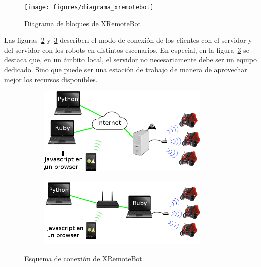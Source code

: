 \begin{figure}
    \centering
    \texttt{[image: figures/diagrama\_xremotebot]}
    \caption{Diagrama de bloques de XRemoteBot}\label{fig:diagrama_xremotebot}
\end{figure}

Las
figuras~\ref{fig:esquema_xremotebot_wan} y~\ref{fig:esquema_xremotebot_lan}
describen el modo de conexión de los clientes con el servidor y del
servidor con los robots en distintos escenarios. En especial, en la
figura~\ref{fig:esquema_xremotebot_lan} se destaca que, en un ámbito
local, el servidor no necesariamente debe ser un equipo dedicado. Sino
que puede ser una estación de trabajo de manera de aprovechar mejor
los recursos disponibles.


\begin{figure}
    \begin{subfigure}[b]{0.48\textwidth}
        \centering
        \includegraphics[width=0.9\textwidth]{figures/arquitectura_propuesta_wan}
        \label{fig:esquema_xremotebot_wan}
    \end{subfigure}%
    \begin{subfigure}[b]{0.48\textwidth}
        \centering
        \includegraphics[width=0.9\textwidth]{figures/arquitectura_propuesta}
        \label{fig:esquema_xremotebot_lan}
    \end{subfigure}
    \caption{Esquema de conexión de XRemoteBot}\label{fig:esquema_xremotebot}
\end{figure}

